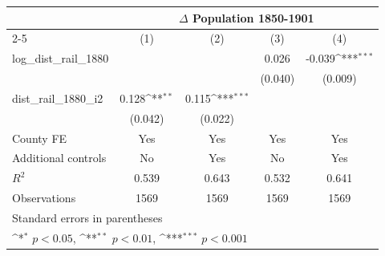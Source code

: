 {
\def\sym#1{\ifmmode^{#1}\else\(^{#1}\)\fi}
\begin{tabular}{l*{4}{c}}
\toprule
                &\multicolumn{4}{c}{$\Delta$ Population 1850-1901}                          \\\cmidrule(lr){2-5}
                &\multicolumn{1}{c}{(1)}         &\multicolumn{1}{c}{(2)}         &\multicolumn{1}{c}{(3)}         &\multicolumn{1}{c}{(4)}         \\
\midrule
log\_dist\_rail\_1880&                  &                  &    0.026         &   -0.039\sym{***}\\
                &                  &                  &  (0.040)         &  (0.009)         \\
dist\_rail\_1880\_i2&    0.128\sym{**} &    0.115\sym{***}&                  &                  \\
                &  (0.042)         &  (0.022)         &                  &                  \\
County FE       &      Yes         &      Yes         &      Yes         &      Yes         \\
Additional controls &       No         &      Yes         &       No         &      Yes         \\
\midrule
\(R^{2}\)       &    0.539         &    0.643         &    0.532         &    0.641         \\
Observations    &     1569         &     1569         &     1569         &     1569         \\
\bottomrule
\multicolumn{5}{l}{\footnotesize Standard errors in parentheses}\\
\multicolumn{5}{l}{\footnotesize \sym{*} \(p<0.05\), \sym{**} \(p<0.01\), \sym{***} \(p<0.001\)}\\
\end{tabular}
}

